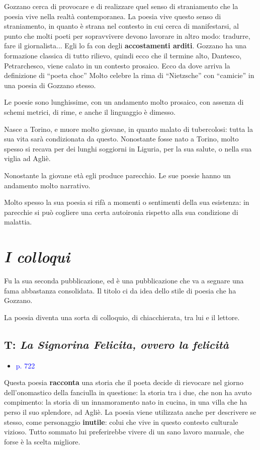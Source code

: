 \documentclass[a4paper, twoside, titlepage]{book}
\newcommand{\elenco}[1]{%
\begin{itemize}
#1
\end{itemize}}
\renewcommand{\emph}[1]{\textcolor{blue}{#1}}
\begin{document}
Gozzano cerca di provocare e di realizzare quel senso di straniamento che la poesia vive nella realtà contemporanea. La poesia vive questo senso di straniamento, in quanto è strana nel contesto in cui cerca di manifestarsi, al punto che molti poeti per sopravvivere devono lavorare in altro modo: tradurre, fare il giornalista...
Egli lo fa con degli \textbf{accostamenti arditi}. Gozzano ha una formazione classica di tutto rilievo, quindi ecco che il termine alto, Dantesco, Petrarchesco, viene calato in un contesto prosaico. Ecco da dove arriva la definizione di “poeta choc”
Molto celebre la rima di “Nietzsche” con “camicie” in una poesia di Gozzano stesso.

Le poesie sono lunghissime, con un andamento molto prosaico, con assenza di schemi metrici, di rime, e anche il linguaggio è dimesso.

Nasce a Torino, e muore molto giovane, in quanto malato di tubercolosi: tutta la sua vita sarà condizionata da questo.
Nonostante fosse nato a Torino, molto spesso si recava per dei lunghi soggiorni in Liguria, per la sua salute, o nella sua viglia ad Agliè.

Nonostante la giovane età egli produce parecchio. Le sue poesie hanno un andamento molto narrativo.

Molto spesso la sua poesia si rifà a momenti o sentimenti della sua esistenza: in parecchie si può cogliere una certa autoironia rispetto alla sua condizione di malattia.

\section{\textit{I colloqui}}

Fu la sua seconda pubblicazione, ed è una pubblicazione che va a segnare una fama abbastanza consolidata.
Il titolo ci da idea dello stile di poesia che ha Gozzano.

La poesia diventa una sorta di colloquio, di chiacchierata, tra lui e il lettore.

\subsection{T: \textit{La Signorina Felicita, ovvero la felicità}}
\elenco{\item \emph{p. 722}}

Questa poesia \textbf{racconta} una storia che il poeta decide di rievocare nel giorno dell’onomastico della fanciulla in questione: la storia tra i due, che non ha avuto compimento: la storia di un innamoramento nato in cucina, in una villa che ha perso il suo splendore, ad Agliè.
La poesia viene utilizzata anche per descrivere se stesso, come personaggio \textbf{inutile}: colui che vive in questo contesto culturale vizioso. Tutto sommato lui preferirebbe vivere di un sano lavoro manuale, che forse è la scelta migliore.
\end{document}
